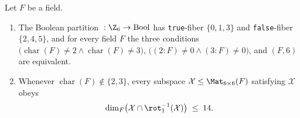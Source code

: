 \begin{lemma}\label{lem:aperiodic-six-shift-14}
Let $F$ be a field.
\begin{enumerate}[label=(\alph*)]
\item The Boolean partition ${}: \Z_6 \to \mathrm{Bool}$ has
  \texttt{true}-fiber $\{0, 1, 3\}$ and \texttt{false}-fiber $\{2, 4, 5\}$, and for every field $F$
  the three conditions $\bigl(\operatorname{char}(F) \ne 2 \wedge \operatorname{char}(F) \ne 3\bigr)$,
  $\bigl((2 : F) \ne 0 \wedge (3 : F) \ne 0\bigr)$, and $(F, 6)$ are equivalent.
\item Whenever $\operatorname{char}(F) \notin \{2, 3\}$, every subspace
  $\mathcal{X} \le \Mat_{6\times 6}(F)$ satisfying
    $\mathcal{X}$ obeys
  \[
    \dim_F\bigl(\mathcal{X} \cap \rot_1^{-1}(\mathcal{X})\bigr) \;\le\; 14.
  \]
\end{enumerate}
\end{lemma}
